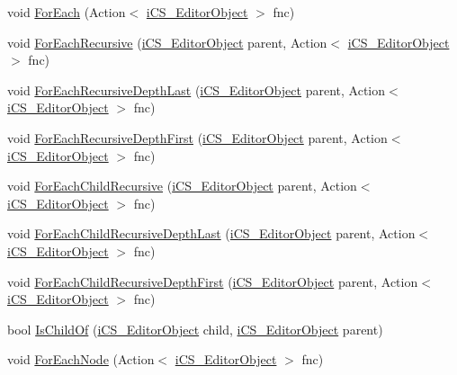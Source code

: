 \begin{DoxyCompactItemize}
\item 
void \hyperlink{classi_c_s___i_storage_a790ba948353f29a6b0a440431ae3bef7}{For\+Each} (Action$<$ \hyperlink{classi_c_s___editor_object}{i\+C\+S\+\_\+\+Editor\+Object} $>$ fnc)
\item 
void \hyperlink{classi_c_s___i_storage_aff3a9a9b4392a8a1d18b8a842a2f5d60}{For\+Each\+Recursive} (\hyperlink{classi_c_s___editor_object}{i\+C\+S\+\_\+\+Editor\+Object} parent, Action$<$ \hyperlink{classi_c_s___editor_object}{i\+C\+S\+\_\+\+Editor\+Object} $>$ fnc)
\item 
void \hyperlink{classi_c_s___i_storage_ab39fc251a21214c401e800545cc8a7ab}{For\+Each\+Recursive\+Depth\+Last} (\hyperlink{classi_c_s___editor_object}{i\+C\+S\+\_\+\+Editor\+Object} parent, Action$<$ \hyperlink{classi_c_s___editor_object}{i\+C\+S\+\_\+\+Editor\+Object} $>$ fnc)
\item 
void \hyperlink{classi_c_s___i_storage_a2e1a9be0381e0c04a7a92e13207dd688}{For\+Each\+Recursive\+Depth\+First} (\hyperlink{classi_c_s___editor_object}{i\+C\+S\+\_\+\+Editor\+Object} parent, Action$<$ \hyperlink{classi_c_s___editor_object}{i\+C\+S\+\_\+\+Editor\+Object} $>$ fnc)
\item 
void \hyperlink{classi_c_s___i_storage_a1494a582e2ca8479cdead9f8ff9463c8}{For\+Each\+Child\+Recursive} (\hyperlink{classi_c_s___editor_object}{i\+C\+S\+\_\+\+Editor\+Object} parent, Action$<$ \hyperlink{classi_c_s___editor_object}{i\+C\+S\+\_\+\+Editor\+Object} $>$ fnc)
\item 
void \hyperlink{classi_c_s___i_storage_a685072431e842957e2f0dd292ae91588}{For\+Each\+Child\+Recursive\+Depth\+Last} (\hyperlink{classi_c_s___editor_object}{i\+C\+S\+\_\+\+Editor\+Object} parent, Action$<$ \hyperlink{classi_c_s___editor_object}{i\+C\+S\+\_\+\+Editor\+Object} $>$ fnc)
\item 
void \hyperlink{classi_c_s___i_storage_a649811d8d660aa5ef58befc0d255f32f}{For\+Each\+Child\+Recursive\+Depth\+First} (\hyperlink{classi_c_s___editor_object}{i\+C\+S\+\_\+\+Editor\+Object} parent, Action$<$ \hyperlink{classi_c_s___editor_object}{i\+C\+S\+\_\+\+Editor\+Object} $>$ fnc)
\item 
bool \hyperlink{classi_c_s___i_storage_a487c6435d7ab26eeac1b7c25285bc332}{Is\+Child\+Of} (\hyperlink{classi_c_s___editor_object}{i\+C\+S\+\_\+\+Editor\+Object} child, \hyperlink{classi_c_s___editor_object}{i\+C\+S\+\_\+\+Editor\+Object} parent)
\item 
void \hyperlink{classi_c_s___i_storage_a6980905b82f4c85dbf6723282bf134e4}{For\+Each\+Node} (Action$<$ \hyperlink{classi_c_s___editor_object}{i\+C\+S\+\_\+\+Editor\+Object} $>$ fnc)

\end{DoxyCompactItemize}
